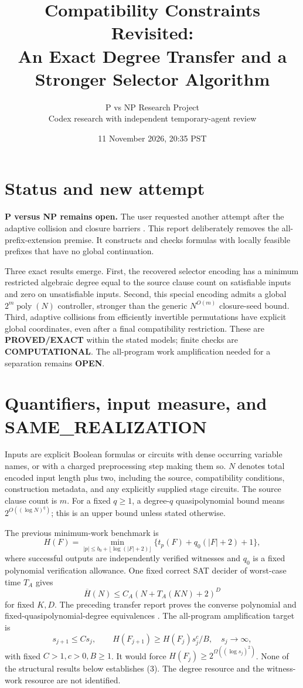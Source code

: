 \documentclass[11pt]{article}
\title{Compatibility Constraints Revisited:\\
An Exact Degree Transfer and a Stronger Selector Algorithm}
\author{P vs NP Research Project\\Codex research with independent temporary-agent review}
\date{11 November 2026, 20:35 PST}
\newcommand{\poly}{\operatorname{poly}}
\begin{document}
\maketitle

\section*{Status and new attempt}
\textbf{P versus NP remains open.}
The user requested another attempt after the adaptive collision and
closure barriers \cite{barriers2026}. This report deliberately removes
the all-prefix-extension premise. It constructs and checks formulas
with locally feasible prefixes that have no global continuation.

Three exact results emerge. First, the recovered selector encoding has
a minimum restricted algebraic degree equal to the source clause count
on satisfiable inputs and zero on unsatisfiable inputs.
Second, this special encoding admits a global $2^m\poly(N)$ controller,
stronger than the generic $N^{O(m)}$ closure-seed bound.
Third, adaptive collisions from efficiently invertible permutations have
explicit global coordinates, even after a final compatibility restriction.
These are \textbf{PROVED/EXACT} within the stated models; finite checks
are \textbf{COMPUTATIONAL}. The all-program work amplification needed
for a separation remains \textbf{OPEN}.

\section*{Quantifiers, input measure, and SAME\_REALIZATION}
Inputs are explicit Boolean formulas or circuits with dense occurring
variable names, or with a charged preprocessing step making them so.
$N$ denotes total encoded input length plus two, including the source,
compatibility conditions, construction metadata, and any explicitly
supplied stage circuits. The source clause count is $m$.
For a fixed $q\ge1$, a degree-$q$ quasipolynomial bound means
$2^{O((\log N)^q)}$; this is an upper bound unless stated otherwise.

The previous minimum-work benchmark is
\[
 H(F)=\min_{|p|\le b_0+\lfloor\log(|F|+2)\rfloor}
       \{t_p(F)+q_0(|F|+2)+1\},
 \tag{1}
\]
where successful outputs are independently verified witnesses and
$q_0$ is a fixed polynomial verification allowance.
One fixed correct SAT decider of worst-case time $T_A$ gives
\[
 \overline H(N)\le C_A(N+T_A(KN)+2)^D
 \tag{2}
\]
for fixed $K,D$. The preceding transfer report proves the converse
polynomial and fixed-quasipolynomial-degree equivalences
\cite{transfer2026}.
The all-program amplification target is
\[
 s_{j+1}\le Cs_j,\qquad
 H(F_{j+1})\ge H(F_j)s_j^c/B,\quad s_j\longrightarrow\infty,
 \tag{3}
\]
with fixed $C>1,c>0,B\ge1$. It would force
$H(F_j)\ge2^{\Omega((\log s_j)^2)}$.
None of the structural results below establishes (3).
The degree resource and the witness-work resource are not identified.
\end{document}
